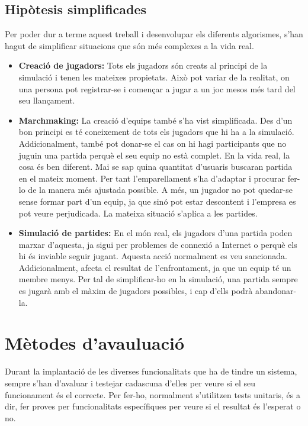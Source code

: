 \documentclass[a4paper]{article}
\begin{document}
\subsection{Hipòtesis simplificades}
Per poder dur a terme aquest treball i desenvolupar els diferents algorismes, s'han hagut de simplificar situacions que són més complexes a la vida real.

\begin{itemize}
    \item \textbf{Creació de jugadors:} Tots els jugadors són creats al principi de la simulació i tenen les mateixes propietats. Això pot variar de la realitat, on una persona pot registrar-se i començar a jugar a un joc mesos més tard del seu llançament. 
    
    \item \textbf{Marchmaking:} La creació d'equips també s'ha vist simplificada. Des d'un bon principi es té coneixement de tots els jugadors que hi ha a la simulació. Addicionalment, també pot donar-se el cas on hi hagi participants que no juguin una partida perquè el seu equip no està complet. En la vida real, la cosa és ben diferent. Mai se sap quina quantitat d'usuaris buscaran partida en el mateix moment. Per tant l'emparellament s'ha d'adaptar i procurar fer-lo de la manera més ajustada possible. A més, un jugador no pot quedar-se sense formar part d'un equip, ja que sinó pot estar descontent i l'empresa es pot veure perjudicada. La mateixa situació s'aplica a les partides.
    
    \item \textbf{Simulació de partides:} En el món real, els jugadors d'una partida poden marxar d'aquesta, ja sigui per problemes de connexió a Internet o perquè els hi és inviable seguir jugant. Aquesta acció normalment es veu sancionada. Addicionalment, afecta el resultat de l'enfrontament, ja que un equip té un membre menys. Per tal de simplificar-ho en la simulació, una partida sempre es jugarà amb el màxim de jugadors possibles, i cap d'ells podrà abandonar-la.
    
\end{itemize}

\newpage

\section{Mètodes d'avauluació}
Durant la implantació de les diverses funcionalitats que ha de tindre un sistema, sempre s'han d'avaluar i testejar cadascuna d'elles per veure si el seu funcionament és el correcte. Per fer-ho, normalment s'utilitzen tests unitaris, és a dir, fer proves per funcionalitats específiques per veure si el resultat és l'esperat o no.
\end{document}
